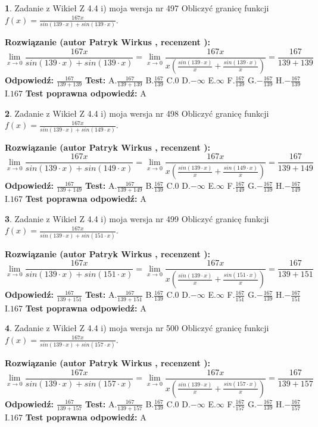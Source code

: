 \documentclass[12pt, a4paper]{article}
\theoremstyle{definition} %
\newtheorem{zad}{}
\newcommand{\zadStart}[1]{\begin{zad}#1\newline}
\newcommand{\zadStop}{\end{zad}}
\newcommand{\rozwStart}[2]{\noindent \textbf{Rozwiązanie (autor #1 , recenzent #2): }\newline}
\newcommand{\rozwStop}{\newline}
\newcommand{\odpStart}{\noindent \textbf{Odpowiedź:}\newline}
\newcommand{\odpStop}{\newline}
\newcommand{\testStart}{\noindent \textbf{Test:}\newline}
\newcommand{\testStop}{\newline}
\newcommand{\kluczStart}{\noindent \textbf{Test poprawna odpowiedź:}\newline}
\newcommand{\kluczStop}{\newline}
\begin{document}
\zadStart{Zadanie z Wikieł Z 4.4 i) moja wersja nr 497}
Obliczyć granicę funkcji $f(x)=\frac{167x}{sin(139\cdot x) +sin(139\cdot x)}$.
\zadStop
\rozwStart{Patryk Wirkus}{}
$$\lim\limits_{x\to 0}\frac{167x}{sin(139\cdot x) +sin(139\cdot x)}=\lim\limits_{x\to 0}\frac{167x}{x(\frac{sin(139\cdot x)}{x}+\frac{sin(139\cdot x)}{x})}=\frac{167}{139+139}$$
\rozwStop
\odpStart
$\frac{167}{139+139}$
\odpStop
\testStart
A.$\frac{167}{139+139}$
B.$\frac{167}{139}$
C.$0$
D.$-\infty$
E.$\infty$
F.$\frac{167}{139}$
G.$-\frac{167}{139}$
H.$-\frac{167}{139}$
I.$167$
\testStop
\kluczStart
A
\kluczStop



\zadStart{Zadanie z Wikieł Z 4.4 i) moja wersja nr 498}
Obliczyć granicę funkcji $f(x)=\frac{167x}{sin(139\cdot x) +sin(149\cdot x)}$.
\zadStop
\rozwStart{Patryk Wirkus}{}
$$\lim\limits_{x\to 0}\frac{167x}{sin(139\cdot x) +sin(149\cdot x)}=\lim\limits_{x\to 0}\frac{167x}{x(\frac{sin(139\cdot x)}{x}+\frac{sin(149\cdot x)}{x})}=\frac{167}{139+149}$$
\rozwStop
\odpStart
$\frac{167}{139+149}$
\odpStop
\testStart
A.$\frac{167}{139+149}$
B.$\frac{167}{139}$
C.$0$
D.$-\infty$
E.$\infty$
F.$\frac{167}{149}$
G.$-\frac{167}{139}$
H.$-\frac{167}{149}$
I.$167$
\testStop
\kluczStart
A
\kluczStop



\zadStart{Zadanie z Wikieł Z 4.4 i) moja wersja nr 499}
Obliczyć granicę funkcji $f(x)=\frac{167x}{sin(139\cdot x) +sin(151\cdot x)}$.
\zadStop
\rozwStart{Patryk Wirkus}{}
$$\lim\limits_{x\to 0}\frac{167x}{sin(139\cdot x) +sin(151\cdot x)}=\lim\limits_{x\to 0}\frac{167x}{x(\frac{sin(139\cdot x)}{x}+\frac{sin(151\cdot x)}{x})}=\frac{167}{139+151}$$
\rozwStop
\odpStart
$\frac{167}{139+151}$
\odpStop
\testStart
A.$\frac{167}{139+151}$
B.$\frac{167}{139}$
C.$0$
D.$-\infty$
E.$\infty$
F.$\frac{167}{151}$
G.$-\frac{167}{139}$
H.$-\frac{167}{151}$
I.$167$
\testStop
\kluczStart
A
\kluczStop



\zadStart{Zadanie z Wikieł Z 4.4 i) moja wersja nr 500}
Obliczyć granicę funkcji $f(x)=\frac{167x}{sin(139\cdot x) +sin(157\cdot x)}$.
\zadStop
\rozwStart{Patryk Wirkus}{}
$$\lim\limits_{x\to 0}\frac{167x}{sin(139\cdot x) +sin(157\cdot x)}=\lim\limits_{x\to 0}\frac{167x}{x(\frac{sin(139\cdot x)}{x}+\frac{sin(157\cdot x)}{x})}=\frac{167}{139+157}$$
\rozwStop
\odpStart
$\frac{167}{139+157}$
\odpStop
\testStart
A.$\frac{167}{139+157}$
B.$\frac{167}{139}$
C.$0$
D.$-\infty$
E.$\infty$
F.$\frac{167}{157}$
G.$-\frac{167}{139}$
H.$-\frac{167}{157}$
I.$167$
\testStop
\kluczStart
A
\kluczStop
\end{document}
